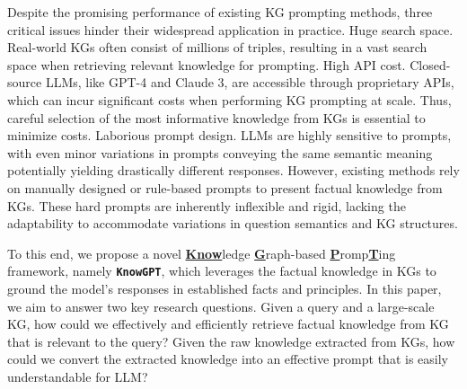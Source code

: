 \documentclass{article}
\theoremstyle{boldremark}
\begin{document}
Despite the promising performance of existing KG prompting methods, three critical issues hinder their widespread application in practice. 
\textbf{} Huge search space. Real-world KGs often consist of millions of triples, resulting in a vast search space when retrieving relevant knowledge for prompting. \textbf{} High API cost. Closed-source LLMs, like GPT-4 and Claude 3, are accessible through proprietary APIs, which can incur significant costs when performing KG prompting at scale. Thus, careful selection of the most informative knowledge from KGs is essential to minimize costs.   \textbf{} Laborious prompt design. LLMs are highly sensitive to prompts, with even minor variations in prompts conveying the same semantic meaning potentially yielding drastically different responses. However, existing methods rely on manually designed or rule-based prompts to present factual knowledge from KGs.  These hard prompts are inherently inflexible and rigid, lacking the adaptability to accommodate variations in question semantics and KG structures. 


To this end, we propose a novel \underline{\textbf{Know}}ledge \underline{\textbf{G}}raph-based \underline{\textbf{P}}romp\underline{\textbf{T}}ing framework, namely {\bf \texttt{KnowGPT}}, which leverages the factual knowledge in KGs to ground the model's responses in established facts and principles.
In this paper, we aim to answer two key research questions.  \textbf{} Given a query and a large-scale KG, how could we effectively and efficiently retrieve factual knowledge from KG that is relevant to the query?  \textbf{} Given the raw knowledge extracted from KGs, how could we convert the extracted knowledge into an effective prompt that is easily understandable for LLM?
\end{document}
